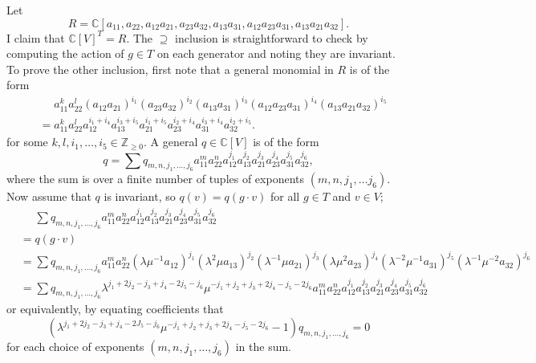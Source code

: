 \documentclass[12pt]{amsart}
\newcommand{\C}{\mathbb{C}}
\theoremstyle{remark}
\theoremstyle{remark}
\begin{document}
Let
$$R = \C[a_{11}, a_{22}, a_{12} a_{21}, a_{23} a_{32}, a_{13} a_{31}, a_{12} a_{23} a_{31}, a_{13} a_{21} a_{32}].$$
I claim that $\C[V]^T = R$.
The $\supseteq$ inclusion is straightforward to check by computing the action of $g \in T$ on each generator and noting they are invariant.
To prove the other inclusion, first note that a general monomial in $R$ is of the form
\begin{align*}
	&\quad \,\, a_{11}^k a_{22}^l (a_{12} a_{21})^{i_1} (a_{23} a_{32})^{i_2} (a_{13} a_{31})^{i_3} (a_{12} a_{23} a_{31})^{i_4} (a_{13} a_{21} a_{32})^{i_5} \\
	&= a_{11}^k a_{22}^l a_{12}^{i_1 + i_4} a_{13}^{i_3 + i_5} a_{21}^{i_1+i_5} a_{23}^{i_2 + i_4} a_{31}^{i_3 + i_4} a_{32}^{i_2+i_5}.
\end{align*}
for some $k, l, i_1, \ldots, i_5 \in \mathbb{Z}_{\ge 0}$.
A general $q \in \C[V]$ is of the form
$$q = \sum q_{m,n,j_1,\ldots,j_6} a_{11}^m a_{22}^n a_{12}^{j_1} a_{13}^{j_2} a_{21}^{j_3} a_{23}^{j_4} a_{31}^{j_5} a_{32}^{j_6},$$
where the sum is over a finite number of tuples of exponents $(m, n, j_1, \ldots j_6)$.
Now assume that $q$ is invariant, so $q(v) = q(g \cdot v)$ for all $g \in T$ and $v \in V$;
\begin{align*}
	&\quad \, \, \sum q_{m,n,j_1,\ldots,j_6} a_{11}^m a_{22}^n a_{12}^{j_1} a_{13}^{j_2} a_{21}^{j_3} a_{23}^{j_4} a_{31}^{j_5} a_{32}^{j_6} \\
	&= q(g \cdot v) \\
	&= \sum q_{m,n,j_1,\ldots,j_6} a_{11}^m a_{22}^n (\lambda \mu^{-1} a_{12})^{j_1} (\lambda^2 \mu a_{13})^{j_2} (\lambda^{-1} \mu a_{21})^{j_3} (\lambda \mu^2 a_{23})^{j_4} (\lambda^{-2} \mu^{-1} a_{31})^{j_5} (\lambda^{-1} \mu^{-2} a_{32})^{j_6} \\
	&= \sum q_{m,n,j_1,\ldots,j_6} \lambda^{j_1 + 2j_2 - j_3 + j_4 -2 j_5 - j_6} \mu^{- j_1 +j_2 +j_3 + 2 j_4 - j_5 -2 j_6} a_{11}^m a_{22}^n a_{12}^{j_1} a_{13}^{j_2} a_{21}^{j_3} a_{23}^{j_4} a_{31}^{j_5} a_{32}^{j_6} 
\end{align*}
or equivalently, by equating coefficients that
$$ (\lambda^{j_1 + 2j_2 - j_3 + j_4 -2 J_5 - j_6} \mu^{- j_1 +j_2 +j_3 + 2 j_4 - j_5 -2 j_6}  - 1) q_{m, n, j_1, \ldots, j_6} = 0$$
for each choice of exponents $(m, n, j_1, \ldots, j_6)$ in the sum.
\end{document}
